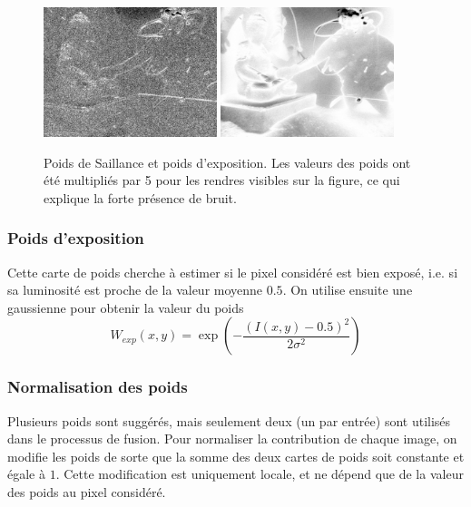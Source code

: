 \documentclass[twoside]{article}
\begin{document}
\begin{figure}[]
  \centering
  \includegraphics[width=0.45\textwidth]{Support/saliency.png}
  \includegraphics[width=0.45\textwidth]{Support/exposedness.png}
  \caption{Poids de Saillance et poids d'exposition. Les valeurs des poids ont été multipliés par 5 pour les rendres visibles sur la figure, ce qui explique la forte présence de bruit.}
\end{figure}

\subsubsection{Poids d'exposition}
Cette carte de poids cherche à estimer si le pixel considéré est bien exposé, i.e. si sa luminosité est proche de la valeur moyenne $0.5$. On utilise ensuite une gaussienne pour obtenir la valeur du poids $$W_{exp}(x,y) = \exp\left(-\frac{(I(x,y) - 0.5)^2}{2\sigma^2}\right)$$

 \subsubsection{Normalisation des poids}
Plusieurs poids sont suggérés, mais seulement deux (un par entrée) sont utilisés dans le processus de fusion. Pour normaliser la contribution de chaque image, on modifie les poids de sorte que la somme des deux cartes de poids soit constante et égale à $1$. Cette modification est uniquement locale, et ne dépend que de la valeur des poids au pixel considéré.
\end{document}
